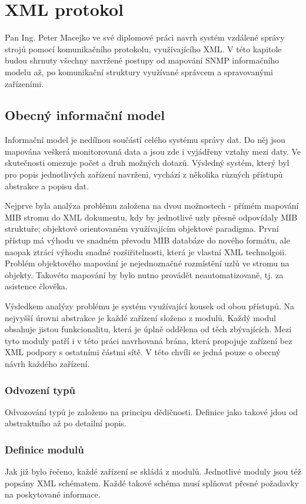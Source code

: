 \chapter{XML protokol}
\label{kap_xml}
Pan Ing. Peter Macejko ve své diplomové práci navrh systém vzdálené správy strojů pomocí komunikačního protokolu, využívajícího XML. V této kapitole budou shrnuty všechny 
navržené postupy od mapování SNMP informačního modelu až, po komunikační struktury využívané správcem a spravovanými zařízeními.

\section{Obecný informační model}
Informační model je nedílnou součástí celého systému správy dat. Do něj jsou mapována veškerá monitorovaná data a jsou zde i vyjádřeny vztahy mezi daty. Ve skutečnosti
omezuje počet a druh možných dotazů. Výsledný systém, který byl pro popis jednotlivých zařízení navrženi, vychází z několika různých přístupů abstrakce a popisu dat.

Nejprve byla analýza problému založena na dvou možnostech - přímém mapování MIB stromu do XML dokumentu, kdy by jednotlivé uzly přesně odpovídaly MIB struktuře; objektově
orientovaném využívajícím objektové paradigma. První přístup má výhodu ve snadném převodu MIB databáze do nového formátu, ale naopak ztrácí výhodu snadné rozšiřitelnosti,
která je vlastní XML technolgoii. Problém objektového mapování je nejednoznačné rozmístění uzlů ve stromu na objekty. Takovéto mapování by bylo nutno provádět
neautomatizovaně, tj. za asistence člověka.

Výsledkem analýzy problému je systém využívající kousek od obou přístupů. Na nejvyšší úrovni abstrakce je každé zařízení složeno z modulů. Každý modul obsahuje jistou
funkcionalitu, která je úplně oddělena od těch zbývajících. Mezi tyto moduly patří i v této práci navrhovaná brána, která propojuje zařízení bez XML podpory s ostatními
částmi sítě. V této chvíli se jedná pouze o obecný návrh každého zařízení.

\subsection{Odvození typů}
Odvozování typů je založeno na principu dědičnosti. Definice jako takové jdou od abstraktního až po detailní popis.

\subsection{Definice modulů}
Jak již bylo řečeno, každé zařízení se skládá z modulů. Jednotlivé moduly jsou též popsány XML schématem. Každé takové schéma
musí splňovat přesné požadavky na poskytované informace.

